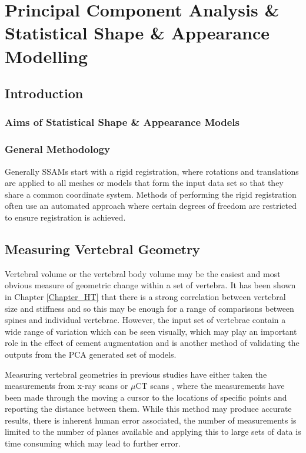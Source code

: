 \chapter{Principal Component Analysis \& Statistical Shape \& Appearance Modelling}

\section{Introduction}

\subsection{Aims of Statistical Shape \& Appearance Models}

\subsection{General Methodology}

Generally SSAMs start with a rigid registration, where rotations and translations are applied to all meshes or models that form the input data set so that they share a common coordinate system.
Methods of performing the rigid registration often use an automated approach where certain degrees of freedom are restricted to ensure registration is achieved.

\section{Measuring Vertebral Geometry}

Vertebral volume or the vertebral body volume may be the easiest and most obvious measure of geometric change within a set of vertebra.
It has been shown in Chapter \ref{Chapter_HT} that there is a strong correlation between vertebral size and stiffness and so this may be enough for a range of comparisons between spines and individual vertebrae.
However, the input set of vertebrae contain a wide range of variation which can be seen visually, which may play an important role in the effect of cement augmentation and is another method of validating the outputs from the PCA generated set of models.

Measuring vertebral geometries in previous studies have either taken the measurements from x-ray scans \cite{Gilad1986,Gilad1985} or $\mu$CT scans \cite{Zhou2000,Cheung1994}, where the measurements have been made through the moving a cursor to the locations of specific points and reporting the distance between them.
While this method may produce accurate results, there is inherent human error associated, the number of measurements is limited to the number of planes available and applying this to large sets of data is time consuming which may lead to further error.

